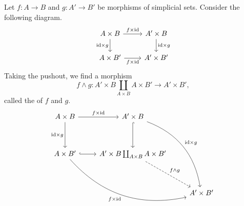 \documentclass[main.tex]{subfiles}
\begin{document}
\begin{definition}
  \label{def:smash_product}
  Let $f\colon A \to B$ and $g\colon A' \to B'$ be morphisms of simplicial sets. Consider the following diagram.
  \begin{equation*}
    \begin{tikzcd}
      A \times B
      \arrow[r, "f \times \id"]
      \arrow[d, swap, "\id \times g"]
      & A' \times B
      \arrow[d, "\id \times g"]
      \\
      A \times B'
      \arrow[r, swap, "f \times \id"]
      & A' \times B'
    \end{tikzcd}
  \end{equation*}
  Taking the pushout, we find a morphism
  \begin{equation*}
    f \wedge g\colon A' \times B \coprod_{A \times B} A \times B' \to A' \times B',
  \end{equation*}
  called the  of $f$ and $g$.
  \begin{equation*}
    \begin{tikzcd}[row sep=huge]
      A \times B
      \arrow[r, "f \times \id"]
      \arrow[d, swap, "\id \times g"]
      & A' \times B
      \arrow[ddr, bend left, "\id \times g"]
      \arrow[d, hookrightarrow]
      \\
      A \times B'
      \arrow[r, hookrightarrow]
      \arrow[rrd, swap, bend right, "f \times \id"]
      & A' \times B \coprod_{A \times B} A \times B'
      \arrow[dr, dashed, "f \wedge g"]
      \\
      && A' \times B'
    \end{tikzcd}
  \end{equation*}
\end{definition}
\end{document}
